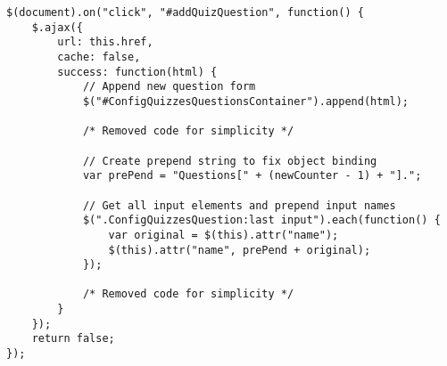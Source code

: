 \begin{lstlisting}[caption=JavaScript udklip til AJAX og model-binding håndtering ved indsættelse af nye spørgsmål, label=lst:QuizzesJavascript]
$(document).on("click", "#addQuizQuestion", function() {
    $.ajax({
        url: this.href,
        cache: false,
        success: function(html) {
            // Append new question form
            $("#ConfigQuizzesQuestionsContainer").append(html);

            /* Removed code for simplicity */
			
            // Create prepend string to fix object binding
            var prePend = "Questions[" + (newCounter - 1) + "].";

            // Get all input elements and prepend input names
            $(".ConfigQuizzesQuestion:last input").each(function() {
                var original = $(this).attr("name");
                $(this).attr("name", prePend + original);
            });
            
            /* Removed code for simplicity */
        }
    });
    return false;
});
\end{lstlisting}